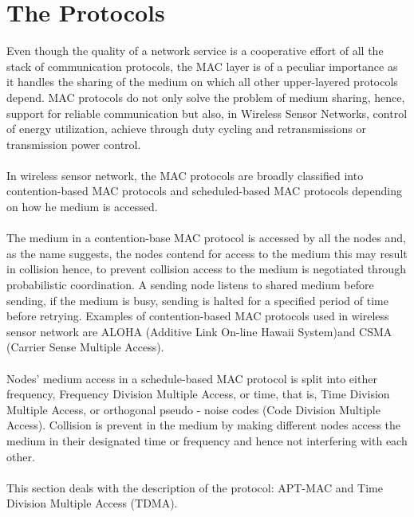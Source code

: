 \section{The Protocols}
Even though the quality of a network service is a cooperative effort of all the stack of communication protocols, the MAC layer is of a peculiar importance as it handles the sharing of the medium on which all other upper-layered protocols depend.
MAC protocols do not only solve the problem of medium sharing, hence, support for reliable communication but also, in Wireless Sensor Networks, control of energy utilization, achieve through duty cycling and retransmissions or transmission power control\cite{Yigitel&Durmaz&Ersoy}.\\\\
In wireless sensor network, the MAC protocols are broadly classified into contention-based MAC protocols and scheduled-based MAC protocols depending on how he medium is accessed\cite{Pal&Chatterjee}.\\\\
The medium in a contention-base MAC protocol is accessed by all the nodes and, as the name suggests, the nodes contend for access to the medium this may result in collision hence, to prevent collision access to the medium is negotiated through probabilistic coordination.
A sending node listens to shared medium before sending, if the medium is busy, sending is halted for a specified period of time before retrying.
Examples of contention-based MAC protocols used in wireless sensor network are ALOHA (Additive Link On-line Hawaii System)and CSMA (Carrier Sense Multiple Access)\cite{Tanenbaum&Wetherall}.\\\\
Nodes' medium access in a schedule-based MAC protocol is split into either frequency, Frequency Division Multiple Access, or time, that is, Time Division Multiple Access, or orthogonal pseudo - noise codes (Code Division Multiple Access).
Collision is prevent in the medium by making different nodes access the medium in their designated time or frequency and hence not interfering with each other.\\\\
This section deals with the description of the protocol: APT-MAC and Time Division Multiple Access (TDMA).

